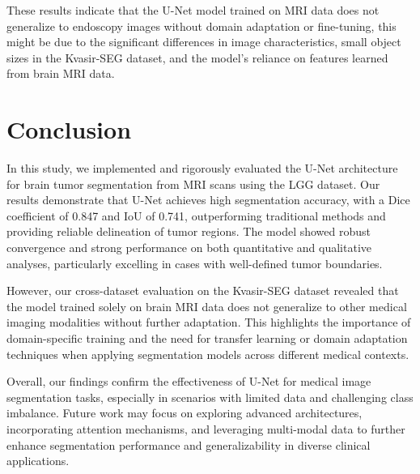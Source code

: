 \documentclass[a4paper, journal]{IEEEtran}
\begin{document}
These results indicate that the U-Net model trained on MRI data does not generalize to endoscopy images without domain adaptation or fine-tuning, this might be due to the significant differences in image characteristics, small object sizes in the Kvasir-SEG dataset, and the model's reliance on features learned from brain MRI data.


\section{Conclusion}
In this study, we implemented and rigorously evaluated the U-Net architecture for brain tumor segmentation from MRI scans using the LGG dataset. Our results demonstrate that U-Net achieves high segmentation accuracy, with a Dice coefficient of 0.847 and IoU of 0.741, outperforming traditional methods and providing reliable delineation of tumor regions. The model showed robust convergence and strong performance on both quantitative and qualitative analyses, particularly excelling in cases with well-defined tumor boundaries.

However, our cross-dataset evaluation on the Kvasir-SEG dataset revealed that the model trained solely on brain MRI data does not generalize to other medical imaging modalities without further adaptation. This highlights the importance of domain-specific training and the need for transfer learning or domain adaptation techniques when applying segmentation models across different medical contexts.

Overall, our findings confirm the effectiveness of U-Net for medical image segmentation tasks, especially in scenarios with limited data and challenging class imbalance. Future work may focus on exploring advanced architectures, incorporating attention mechanisms, and leveraging multi-modal data to further enhance segmentation performance and generalizability in diverse clinical applications.
\end{document}
